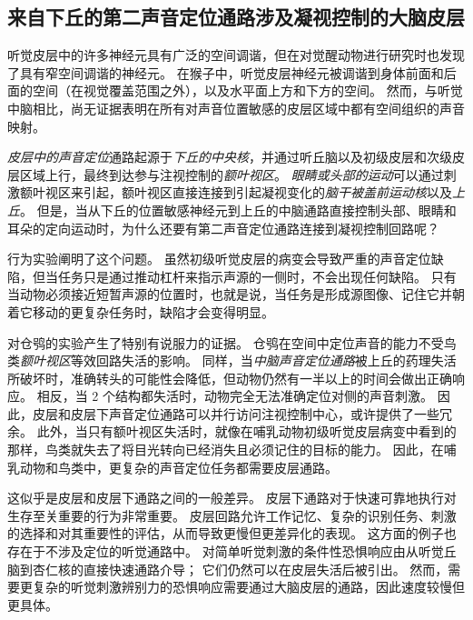 \subsection{来自下丘的第二声音定位通路涉及凝视控制的大脑皮层}

听觉皮层中的许多神经元具有广泛的空间调谐，但在对觉醒动物进行研究时也发现了具有窄空间调谐的神经元。
在猴子中，听觉皮层神经元被调谐到身体前面和后面的空间（在视觉覆盖范围之外），以及水平面上方和下方的空间。
然而，与听觉中脑相比，尚无证据表明在所有对声音位置敏感的皮层区域中都有空间组织的声音映射。


\textit{皮层中的声音定位}通路起源于\textit{下丘的中央核}，并通过听丘脑以及初级皮层和次级皮层区域上行，最终到达参与注视控制的\textit{额叶视区}。
\textit{眼睛或头部的运动}可以通过刺激额叶视区来引起，额叶视区直接连接到引起凝视变化的\textit{脑干被盖前运动核}以及\textit{上丘}。
但是，当从下丘的位置敏感神经元到上丘的中脑通路直接控制头部、眼睛和耳朵的定向运动时，为什么还要有第二声音定位通路连接到凝视控制回路呢？


行为实验阐明了这个问题。
虽然初级听觉皮层的病变会导致严重的声音定位缺陷，但当任务只是通过推动杠杆来指示声源的一侧时，不会出现任何缺陷。
只有当动物必须接近短暂声源的位置时，也就是说，当任务是形成源图像、记住它并朝着它移动的更复杂任务时，缺陷才会变得明显。



对仓鸮的实验产生了特别有说服力的证据。
仓鸮在空间中定位声音的能力不受鸟类\textit{额叶视区}等效回路失活的影响。
同样，当\textit{中脑声音定位通路}被上丘的药理失活所破坏时，准确转头的可能性会降低，但动物仍然有一半以上的时间会做出正确响应。
相反，当 2 个结构都失活时，动物完全无法准确定位对侧的声音刺激。
因此，皮层和皮层下声音定位通路可以并行访问注视控制中心，或许提供了一些冗余。
此外，当只有额叶视区失活时，就像在哺乳动物初级听觉皮层病变中看到的那样，鸟类就失去了将目光转向已经消失且必须记住的目标的能力。
因此，在哺乳动物和鸟类中，更复杂的声音定位任务都需要皮层通路。


这似乎是皮层和皮层下通路之间的一般差异。
皮层下通路对于快速可靠地执行对生存至关重要的行为非常重要。
皮层回路允许工作记忆、复杂的识别任务、刺激的选择和对其重要性的评估，从而导致更慢但更差异化的表现。
这方面的例子也存在于不涉及定位的听觉通路中。
对简单听觉刺激的条件性恐惧响应由从听觉丘脑到杏仁核的直接快速通路介导；
它们仍然可以在皮层失活后被引出。
然而，需要更复杂的听觉刺激辨别力的恐惧响应需要通过大脑皮层的通路，因此速度较慢但更具体。




